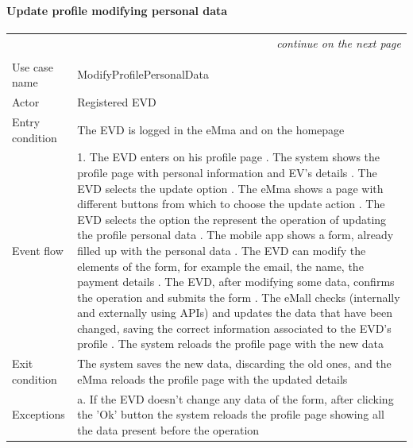 \paragraph{Update profile modifying personal data}
\begin{center}
    \begin{longtable}{p{4cm} p{11cm}}
    \multicolumn{2}{r}{\itshape{continue on the next page}}\\
    \endfoot 
    \\
    \endlastfoot
    \hline
     Use case name &  ModifyProfilePersonalData\\
     \hline
     Actor & Registered EVD \\
     \hline
     Entry condition & The EVD is logged in the eMma and on the homepage \\
     \hline
     Event flow &   1. The EVD enters on his profile page \newline
                    2. The system shows the profile page with personal information and EV's details \newline
                    3. The EVD selects the update option \newline
                    4. The eMma shows a page with different buttons from which to choose the update action \newline
                    5. The EVD selects the option the represent the operation of updating the profile personal data \newline
                    6. The mobile app shows a form, already filled up with the personal data \newline
                    7. The EVD can modify the elements of the form, for example the email, the name, the payment details \newline
                    8. The EVD, after modifying some data, confirms the operation and submits the form \newline
                    9. The eMall checks (internally and externally using APIs) and updates the data that have been changed, saving the correct information associated to the EVD's profile \newline
                    10. The system reloads the profile page with the new data \\
     \hline
     Exit condition & The system saves the new data, discarding the old ones, and the eMma reloads the profile page with the updated details\\
     \hline
     Exceptions &   
        a. If the EVD doesn't change any data of the form, after clicking the 'Ok' button the system reloads the profile page showing all the data present before the operation \newline

\end{longtable}
\end{center}
